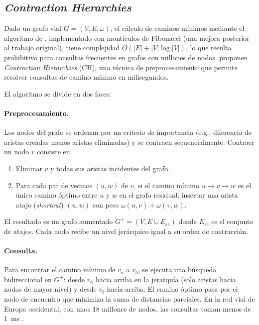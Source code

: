 \documentclass[12pt,letterpaper,oneside]{book}
\begin{document}
	\subsection{\textit{Contraction Hierarchies}}

	Dado un grafo vial $G = (V, E, \omega)$, el cálculo de caminos mínimos
	mediante el algoritmo de \citet{Dijkstra1959}, implementado con
	montículos de Fibonacci (una mejora posterior al trabajo original), tiene complejidad
	$O(|E| + |V| \log |V|)$, lo que resulta prohibitivo para consultas
	frecuentes en grafos con millones de nodos.  \citet{Geisberger2008}
	proponen \textit{Contraction Hierarchies} (CH), una técnica de
	preprocesamiento que permite resolver consultas de camino mínimo en
	milisegundos.

	El algoritmo se divide en dos fases:

	\paragraph{Preprocesamiento.}
	Los nodos del grafo se ordenan por un criterio de importancia
	(e.g., diferencia de aristas creadas menos aristas eliminadas) y se
	contraen secuencialmente.  Contraer un nodo $v$ consiste en:
	\begin{enumerate}
		\item Eliminar $v$ y todas sus aristas incidentes del grafo.
		\item Para cada par de vecinos $(u, w)$ de $v$, si el camino mínimo
		      $u \to v \to w$ es el único camino óptimo entre $u$ y $w$ en el
		      grafo residual, insertar una arista atajo
		      (\textit{shortcut}) $(u, w)$ con peso $\omega(u,v) + \omega(v,w)$.
	\end{enumerate}
	El resultado es un grafo aumentado $G^+ = (V, E \cup E_{sc})$ donde
	$E_{sc}$ es el conjunto de atajos.  Cada nodo recibe un nivel jerárquico
	igual a su orden de contracción.

	\paragraph{Consulta.}
	Para encontrar el camino mínimo de $v_a$ a $v_b$, se ejecuta una
	búsqueda bidireccional en $G^+$: desde $v_a$ hacia arriba en la
	jerarquía (solo aristas hacia nodos de mayor nivel) y desde $v_b$ hacia
	arriba.  El camino óptimo pasa por el nodo de encuentro que minimiza la
	suma de distancias parciales.  En la red vial de Europa occidental, con
	unos 18 millones de nodos, las consultas toman menos de 1~ms
	\citep{Geisberger2008}.
\end{document}
